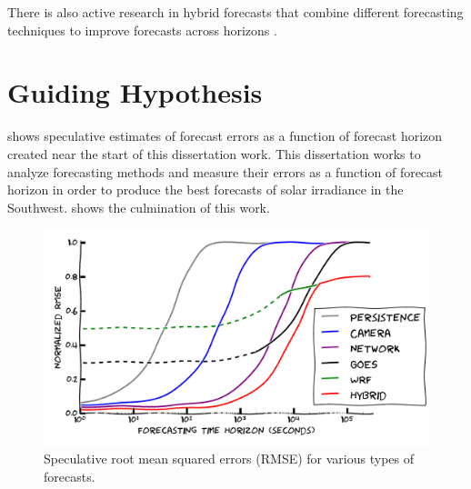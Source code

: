 There is also active research in hybrid forecasts that combine
different forecasting techniques to improve forecasts across horizons
\citep{Lu2015}.


\section{Guiding Hypothesis}

 shows speculative estimates of
forecast errors as a function of forecast horizon created near the
start of this dissertation work.
This dissertation works to analyze forecasting methods and measure
their errors as a function of forecast horizon in order to
produce the best forecasts of solar irradiance in the Southwest.
 shows the culmination of this work.

\begin{figure}[htbp]
\includegraphics[width=\textwidth]{figs/bullshit.pdf}
\caption[Speculative errors for various forecasting
techniques]{Speculative root mean squared errors (RMSE) for various
  types of forecasts.}
\label{fig:bullshitplot}
\end{figure}

